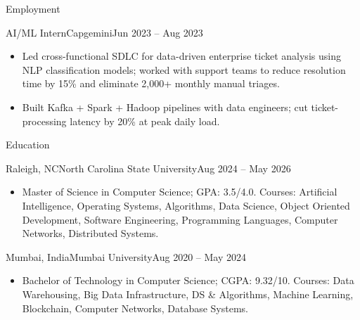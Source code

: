 \documentclass[]{mcdowellcv}
\begin{document}
\begin{cvsection}{Employment}
  \begin{cvsubsection}{AI/ML Intern}{Capgemini}{Jun 2023 -- Aug 2023}
    \begin{itemize}
      \item Led cross-functional SDLC for data-driven enterprise ticket analysis using NLP classification models; worked with support teams to reduce resolution time by 15\% and eliminate 2,000+ monthly manual triages.
      \item Built Kafka + Spark + Hadoop pipelines with data engineers; cut ticket-processing latency by 20\% at peak daily load.
    \end{itemize}
    \vspace{-1.5pt}
  \end{cvsubsection}
\end{cvsection}

\begin{cvsection}{Education}
  \begin{cvsubsection}{Raleigh, NC}{North Carolina State University}{Aug 2024 -- May 2026}
    \begin{itemize}
      \item Master of Science in Computer Science; GPA: 3.5/4.0. Courses: Artificial Intelligence, Operating Systems, Algorithms, Data Science, Object Oriented Development, Software Engineering, Programming Languages, Computer Networks, Distributed Systems.
    \end{itemize}
    \vspace{-1.5pt}
  \end{cvsubsection}

  \begin{cvsubsection}{Mumbai, India}{Mumbai University}{Aug 2020 -- May 2024}
    \begin{itemize}
      \item Bachelor of Technology in Computer Science; CGPA: 9.32/10. Courses: Data Warehousing, Big Data Infrastructure, DS \& Algorithms, Machine Learning, Blockchain, Computer Networks, Database Systems.
    \end{itemize}
    \vspace{-1.5pt}
  \end{cvsubsection}
\end{cvsection}
\end{document}
